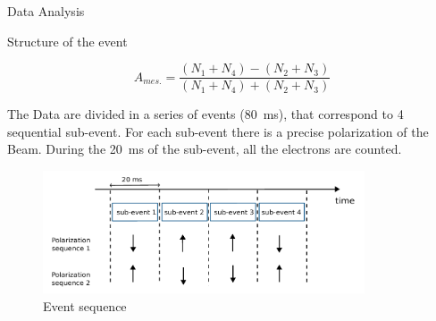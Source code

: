 \documentclass[9pt,a4paper]{beamer}
\begin{document}
\begin{frame}[noframenumbering]{Data Analysis}
\begin{center}
\end{center}
\end{frame}

\begin{frame}{Structure of the event}

\begin{equation}
A_{mes.} = \dfrac{(N_{1} + N_{4}) - (N_{2} + N_{3})}{(N_{1} + N_{4}) + (N_{2} + N_{3})}
\end{equation}

The Data are divided in a series of events (\SI{80}{\milli \second}), that correspond to 4 sequential sub-event. For each sub-event there is a precise polarization of the Beam. During the \SI{20}{\milli \second} of the sub-event, all the electrons are counted. 

\begin{figure}[hbtp]
\centering
\includegraphics[width = 0.85\textwidth]{figures/EventStructure.pdf}
\caption{Event sequence}
\end{figure}
\end{frame}
\end{document}
